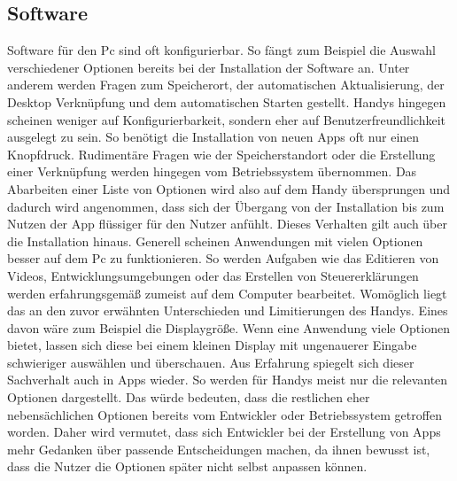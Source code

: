 \subsection{Software}\myCheckmark
Software für den Pc sind oft konfigurierbar. %
	So fängt zum Beispiel die Auswahl verschiedener Optionen bereits bei der Installation der Software an. Unter anderem werden Fragen zum Speicherort, der automatischen Aktualisierung, der Desktop Verknüpfung und dem automatischen Starten gestellt.\newline%
Handys hingegen scheinen weniger auf Konfigurierbarkeit, sondern eher auf Benutzerfreundlichkeit ausgelegt zu sein. %
	So benötigt die Installation von neuen Apps oft nur einen Knopfdruck. Rudimentäre Fragen wie der Speicherstandort oder die Erstellung einer Verknüpfung werden hingegen vom Betriebssystem übernommen. Das Abarbeiten einer Liste von Optionen wird also auf dem Handy übersprungen und dadurch wird angenommen, dass sich der Übergang von der Installation bis zum Nutzen der App flüssiger für den Nutzer anfühlt.\newline%
Dieses Verhalten gilt auch über die Installation hinaus. Generell scheinen Anwendungen mit vielen Optionen besser auf dem Pc zu funktionieren. %
	So werden Aufgaben wie das Editieren von Videos, Entwicklungsumgebungen oder das Erstellen von Steuererklärungen werden erfahrungsgemäß zumeist auf dem Computer bearbeitet. %
		Womöglich liegt das an den zuvor erwähnten Unterschieden und Limitierungen des Handys. Eines davon wäre zum Beispiel die Displaygröße. Wenn eine Anwendung viele Optionen bietet, lassen sich diese bei einem kleinen Display mit ungenauerer Eingabe schwieriger auswählen und überschauen.\newline%
Aus Erfahrung spiegelt sich dieser Sachverhalt auch in Apps wieder. So werden für Handys meist nur die relevanten Optionen dargestellt. Das würde bedeuten, dass die restlichen eher nebensächlichen Optionen bereits vom Entwickler oder Betriebssystem getroffen worden.\newline%
	Daher wird vermutet, dass sich Entwickler bei der Erstellung von Apps mehr Gedanken über passende Entscheidungen machen, da ihnen bewusst ist, dass die Nutzer die Optionen später nicht selbst anpassen können.\newline%
